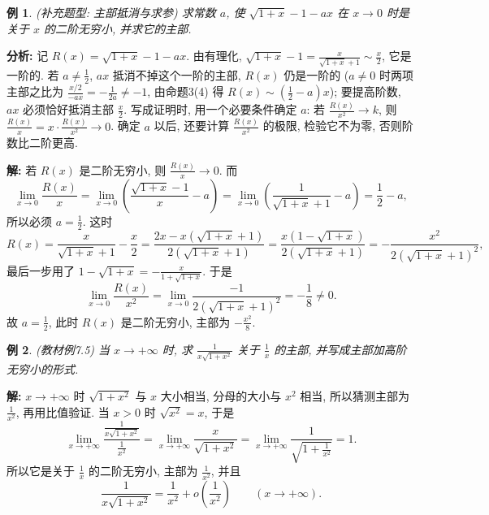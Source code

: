 \documentclass[UTF8,openany]{ctexbook}
\theoremstyle{chinesetextbook}
\newtheorem{example}{例}[section]
\newenvironment{cnsolution}{\par\indent\textbf{解:} \ignorespaces}{\par}
\begin{document}
\begin{example}
\textnormal{(补充题型: 主部抵消与求参)} 求常数 $a$, 使 $\sqrt{1+x}-1-ax$ 在 $x\to0$ 时是关于 $x$ 的二阶无穷小, 并求它的主部.
\end{example}
\par\indent\textbf{分析:} 记 $R(x)=\sqrt{1+x}-1-ax$. 由有理化, $\displaystyle\sqrt{1+x}-1=\frac x{\sqrt{1+x}+1}\sim\frac x2$, 它是一阶的. 若 $\displaystyle a\ne\frac12$, $ax$ 抵消不掉这个一阶的主部, $R(x)$ 仍是一阶的 ($a\ne0$ 时两项主部之比为 $\displaystyle\frac{x/2}{-ax}=-\frac1{2a}\ne-1$, 由命题3(4) 得 $\displaystyle R(x)\sim\left(\frac12-a\right)x$); 要提高阶数, $ax$ 必须恰好抵消主部 $\displaystyle\frac x2$. 写成证明时, 用一个必要条件确定 $a$: 若 $\displaystyle\frac{R(x)}{x^2}\to k$, 则 $\displaystyle\frac{R(x)}x=x\cdot\frac{R(x)}{x^2}\to0$. 确定 $a$ 以后, 还要计算 $\displaystyle\frac{R(x)}{x^2}$ 的极限, 检验它不为零, 否则阶数比二阶更高.
\begin{cnsolution}
若 $R(x)$ 是二阶无穷小, 则 $\displaystyle\frac{R(x)}x\to0$. 而
\[
\lim_{x\to0}\frac{R(x)}x=\lim_{x\to0}\left(\frac{\sqrt{1+x}-1}x-a\right)=\lim_{x\to0}\left(\frac1{\sqrt{1+x}+1}-a\right)=\frac12-a,
\]
所以必须 $\displaystyle a=\frac12$. 这时
\[
R(x)=\frac x{\sqrt{1+x}+1}-\frac x2=\frac{2x-x\left(\sqrt{1+x}+1\right)}{2\left(\sqrt{1+x}+1\right)}=\frac{x\left(1-\sqrt{1+x}\right)}{2\left(\sqrt{1+x}+1\right)}=-\frac{x^2}{2\left(\sqrt{1+x}+1\right)^2},
\]
最后一步用了 $\displaystyle1-\sqrt{1+x}=-\frac x{1+\sqrt{1+x}}$. 于是
\[
\lim_{x\to0}\frac{R(x)}{x^2}=\lim_{x\to0}\frac{-1}{2\left(\sqrt{1+x}+1\right)^2}=-\frac18\ne0.
\]
故 $\displaystyle a=\frac12$, 此时 $R(x)$ 是二阶无穷小, 主部为 $\displaystyle-\frac{x^2}8$.
\end{cnsolution}
\begin{example}
\textnormal{(教材例7.5)} 当 $x\to+\infty$ 时, 求 $\displaystyle\frac1{x\sqrt{1+x^2}}$ 关于 $\displaystyle\frac1x$ 的主部, 并写成主部加高阶无穷小的形式.
\end{example}
\begin{cnsolution}
$x\to+\infty$ 时 $\sqrt{1+x^2}$ 与 $x$ 大小相当, 分母的大小与 $x^2$ 相当, 所以猜测主部为 $\displaystyle\frac1{x^2}$, 再用比值验证. 当 $x>0$ 时 $\sqrt{x^2}=x$, 于是
\[
\lim_{x\to+\infty}\frac{\frac1{x\sqrt{1+x^2}}}{\frac1{x^2}}=\lim_{x\to+\infty}\frac x{\sqrt{1+x^2}}=\lim_{x\to+\infty}\frac1{\sqrt{1+\frac1{x^2}}}=1.
\]
所以它是关于 $\displaystyle\frac1x$ 的二阶无穷小, 主部为 $\displaystyle\frac1{x^2}$, 并且
\[
\frac1{x\sqrt{1+x^2}}=\frac1{x^2}+o\!\left(\frac1{x^2}\right)\qquad(x\to+\infty).
\]
\end{cnsolution}
\end{document}

